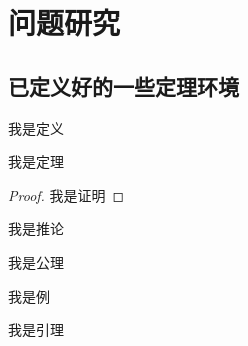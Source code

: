 \chapter{问题研究}


\section{已定义好的一些定理环境}


\begin{definition}
  我是定义
\end{definition}

\begin{theorem}
  我是定理
\end{theorem}

\begin{proof}
  我是证明
\end{proof}

\begin{corollary}
  我是推论
\end{corollary}

\begin{axiom}
  我是公理
\end{axiom}


\begin{example}
  我是例
\end{example}

\begin{lemma}
  我是引理
\end{lemma}



